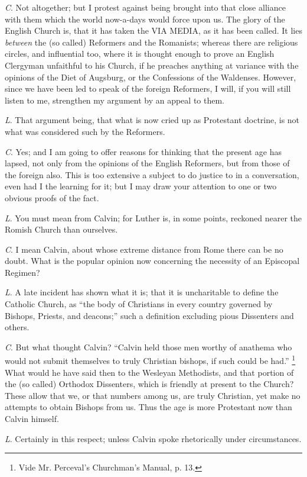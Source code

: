 \emph{C}. Not altogether; but I protest against
being brought into that close alliance with them which the world
now-a-days would force upon us. The glory of the English Church is,
that it has taken the VIA MEDIA,
as it has been called. It lies \emph{between} the (so called)
Reformers and the Romanists; whereas there are religious circles, and
influential too, where it is thought enough to prove an English
Clergyman unfaithful to his Church, if he preaches anything at
variance with the opinions of the Diet of Augsburg, or the Confessions
of the Waldenses. However, since we have been led to speak of the
foreign Reformers, I will, if you will still listen to me, strengthen
my argument by an appeal to them.

\emph{L}. That argument being, that what is now
cried up as Protestant doctrine, is not what was considered such by
the Reformers.

\emph{C}. Yes; and I am going to offer reasons
for thinking that the present age has lapsed, not only from the
opinions of the English Reformers, but from those of the foreign also.
This is too extensive a subject to do justice to in a conversation,
even had I the learning for it; but I may draw your attention to one
or two obvious proofs of the fact.

\emph{L}. You must mean from Calvin; for Luther
is, in some points, reckoned nearer the Romish Church than ourselves.

\emph{C}. I mean Calvin, about whose extreme
distance from Rome there can be no doubt. What is the popular opinion
now concerning the necessity of an Episcopal Regimen?

\emph{L}. A late incident has shown what it is;
that it is uncharitable to define the Catholic Church, as ``the body of
Christians in every country governed by Bishops, Priests, and deacons;''
such a definition excluding pious Dissenters and others.

\emph{C}. But what thought Calvin? ``Calvin held
those men worthy of anathema who would not submit themselves to truly
Christian bishops, if such could be had.'' \footnote{Vide Mr. Perceval's Churchman's Manual, p. 13.} What would he have said then to the Wesleyan Methodists, and
that portion of the (so called) Orthodox Dissenters, which is friendly
at present to the Church? These allow that we, or that numbers among
us, are truly Christian, yet make no attempts to obtain Bishops from
us. Thus the age is more Protestant now than Calvin himself.

\emph{L}. Certainly in this respect; unless
Calvin spoke rhetorically under circumstances.

